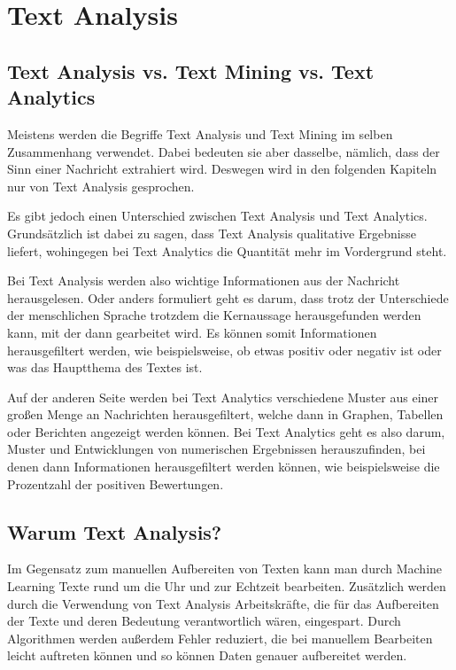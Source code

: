 \section{Text Analysis}\label{sec:text-analysis}

\subsection{Text Analysis vs. Text Mining vs. Text Analytics}\label{subsec:text-analysis-vs-text-mining-vs-text-analytics}

Meistens werden die Begriffe Text Analysis und Text Mining im selben Zusammenhang verwendet.
Dabei bedeuten sie aber dasselbe, nämlich, dass der Sinn einer Nachricht extrahiert wird.
Deswegen wird in den folgenden Kapiteln nur von Text Analysis gesprochen.

Es gibt jedoch einen Unterschied zwischen Text Analysis und Text Analytics.
Grundsätzlich ist dabei zu sagen, dass Text Analysis qualitative Ergebnisse liefert, wohingegen bei Text Analytics die Quantität mehr im Vordergrund steht.\cite{textAnalysisMonkeylearn, machineLearningTextAnalysis}

Bei Text Analysis werden also wichtige Informationen aus der Nachricht herausgelesen.
Oder anders formuliert geht es darum, dass trotz der Unterschiede der menschlichen Sprache trotzdem die Kernaussage herausgefunden werden kann, mit der dann gearbeitet wird.
Es können somit Informationen herausgefiltert werden, wie beispielsweise, ob etwas positiv oder negativ ist oder was das Hauptthema des Textes ist.\cite{textAnalysisMonkeylearn, machineLearningTextAnalysis}

Auf der anderen Seite werden bei Text Analytics verschiedene Muster aus einer großen Menge an Nachrichten herausgefiltert, welche dann in Graphen, Tabellen oder Berichten angezeigt werden können.
Bei Text Analytics geht es also darum, Muster und Entwicklungen von numerischen Ergebnissen herauszufinden, bei denen dann Informationen herausgefiltert werden können, wie beispielsweise die Prozentzahl der positiven Bewertungen.\cite{textAnalysisMonkeylearn, machineLearningTextAnalysis}

\subsection{Warum Text Analysis?}\label{subsec:why-text-analysis}

Im Gegensatz zum manuellen Aufbereiten von Texten kann man durch Machine Learning Texte rund um die Uhr und zur Echtzeit bearbeiten.
Zusätzlich werden durch die Verwendung von Text Analysis Arbeitskräfte, die für das Aufbereiten der Texte und deren Bedeutung verantwortlich wären, eingespart.
Durch Algorithmen werden außerdem Fehler reduziert, die bei manuellem Bearbeiten leicht auftreten können und so können Daten genauer aufbereitet werden.\cite{textAnalysisMonkeylearn}

